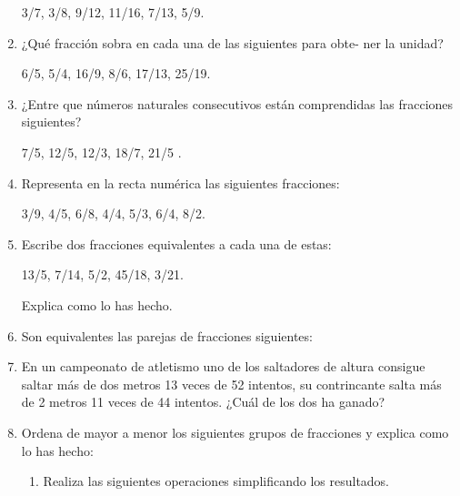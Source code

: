 \documentclass[10pt,twoside]{article}
\begin{document}
\begin{enumerate}
3/7, 3/8, 9/12, 11/16, 7/13, 5/9.
\item ¿Qué fracción sobra en cada una de las siguientes para obte-
ner la unidad?

6/5, 5/4, 16/9, 8/6, 17/13, 25/19.
\item ¿Entre que números naturales consecutivos están comprendidas las fracciones siguientes? 

7/5, 12/5, 12/3, 18/7, 21/5 .
\item Representa en la recta numérica las siguientes fracciones:

3/9, 4/5, 6/8, 4/4, 5/3, 6/4, 8/2.
\item Escribe dos fracciones equivalentes a cada una de estas:

13/5, 7/14, 5/2, 45/18, 3/21.

Explica como lo has hecho.
\item  Son equivalentes las parejas de fracciones siguientes:
\begin{enumerate}
\end{enumerate}
\item  En un campeonato de atletismo uno de los saltadores de altura consigue saltar más de dos metros 13 veces de 52 intentos, su contrincante salta más de 2 metros 11 veces de 44 intentos. ¿Cuál de los dos ha ganado?
\item  Ordena de mayor a menor los siguientes grupos de fracciones y explica como lo has hecho:
\begin{enumerate}
 \item Realiza las siguientes operaciones simplificando los resultados.

\end{enumerate}

\end{enumerate}
\end{document}
